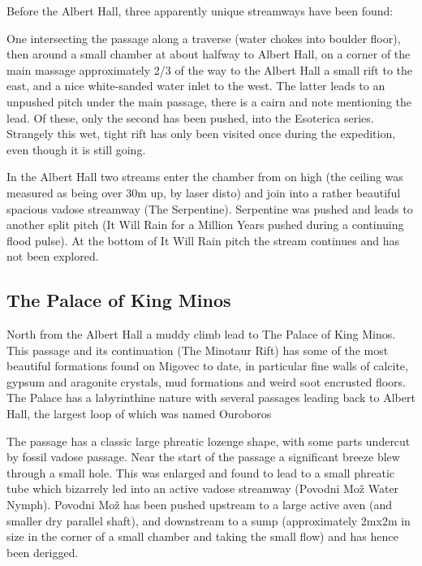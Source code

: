 Before the Albert Hall, three apparently unique streamways have been
found:

One intersecting the passage along a traverse (water chokes into boulder
floor), then around a small chamber at about halfway to Albert Hall, on
a corner of the main massage approximately 2/3 of the way to the Albert
Hall a small rift to the east, and a nice white-sanded water inlet to
the west. The latter leads to an unpushed pitch under the main passage,
there is a cairn and note mentioning the lead. Of these, only the second
has been pushed, into the Esoterica series. Strangely this wet, tight
rift has only been visited once during the expedition, even though it is
still going.

In the Albert Hall two streams enter the chamber from on high (the
ceiling was measured as being over 30m up, by laser disto) and join into
a rather beautiful spacious vadose streamway (The Serpentine).
Serpentine was pushed and leads to another split pitch (It Will Rain for
a Million Years \textemdash{} pushed during a continuing flood pulse).
At the bottom of It Will Rain pitch the stream continues and has not
been explored.

\hypertarget{the-palace-of-king-minos}{%
\subsection{The Palace of King Minos}\label{the-palace-of-king-minos}}

North from the Albert Hall a muddy climb lead to The Palace of King
Minos. This passage and its continuation (The Minotaur Rift) has some of
the most beautiful formations found on Migovec to date, in particular
fine walls of calcite, gypsum and aragonite crystals, mud formations and
weird soot encrusted floors. The Palace has a labyrinthine nature with
several passages leading back to Albert Hall, the largest loop of which
was named Ouroboros

The passage has a classic large phreatic lozenge shape, with some parts
undercut by fossil vadose passage. Near the start of the passage a
significant breeze blew through a small hole. This was enlarged and
found to lead to a small phreatic tube which bizarrely led into an
active vadose streamway (Povodni Mo\v{z} \textemdash{} Water Nymph).
Povodni Mo\v{z} has been pushed upstream to a large active aven (and
smaller dry parallel shaft), and downstream to a sump (approximately
2mx2m in size in the corner of a small chamber and taking the small
flow) and has hence been derigged.

